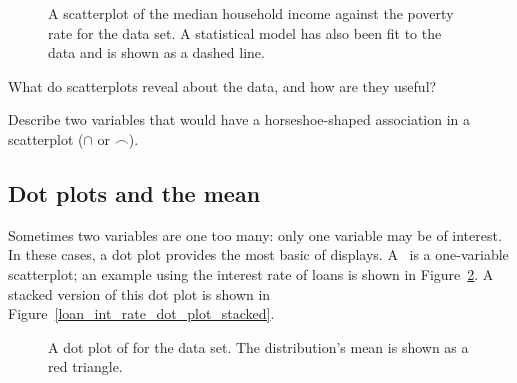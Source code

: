 \begin{figure}[h]
  \centering
  \caption{A scatterplot of the median household income
      against the poverty rate for the
       data set.
      A statistical model has also been fit to the data
      and is shown as a dashed line.}
  \label{medianHHIncomePoverty}
\end{figure}

\D{\newpage}

\begin{exercisewrap}
\begin{nexercise}
What do scatterplots reveal about the data,
and how are they useful?\footnotemark{}
\end{nexercise}
\end{exercisewrap}

\begin{exercisewrap}
\begin{nexercise}
Describe two variables that would have a horseshoe-shaped
association in a scatterplot ($\cap$ or $\frown$).\footnotemark{}
\end{nexercise}
\end{exercisewrap}



\subsection{Dot plots and the mean}
\label{dotPlot}

Sometimes two variables are one too many:
only one variable may be of interest.
In these cases, a dot plot provides the most basic of displays.
A~ is a one-variable scatterplot;
an example using the interest rate of \loanN{} loans
is shown in Figure~\ref{loan_int_rate_dot_plot}.
A stacked version of this dot plot is shown in
Figure~\ref{loan_int_rate_dot_plot_stacked}.

\begin{figure}[h]
  \centering
  \caption{A dot plot of 
      for the  data set.
      The distribution's mean is shown as a red triangle.}
  \label{loan_int_rate_dot_plot}
\end{figure}

